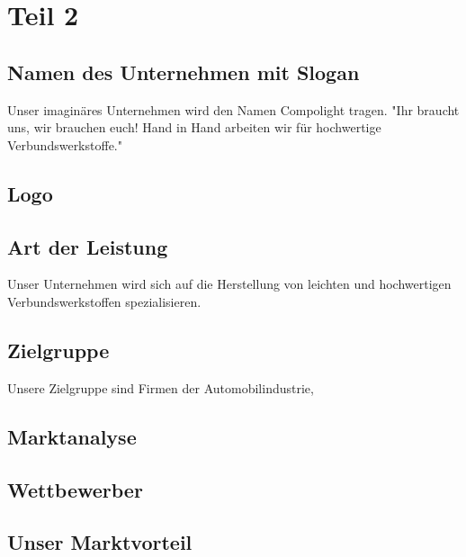 \section{Teil 2}
    \subsection{Namen des Unternehmen mit Slogan}
    Unser imaginäres Unternehmen wird den Namen Compolight tragen.
    "Ihr braucht uns, wir brauchen euch! Hand in Hand arbeiten wir für hochwertige Verbundswerkstoffe."
    \subsection{Logo}

    \subsection{Art der Leistung}
    Unser Unternehmen wird sich auf die Herstellung von leichten und hochwertigen Verbundswerkstoffen spezialisieren.
    \subsection{Zielgruppe}
    Unsere Zielgruppe sind Firmen der Automobilindustrie, 

    \subsection{Marktanalyse}

    \subsection{Wettbewerber}


    \subsection{Unser Marktvorteil}
    